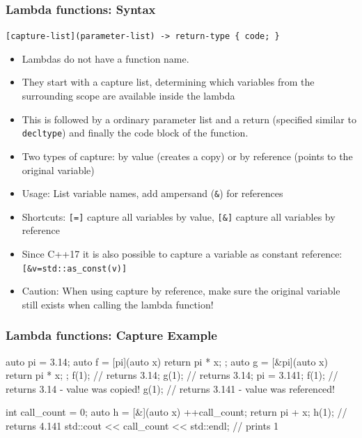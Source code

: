 \documentclass[aspectratio=169,ignorenonframetext,11pt]{beamer}
\def\inline{\lstinline[basicstyle=\small\ttfamily]}
\begin{document}
\begin{frame}[fragile]
  \frametitle{Lambda functions: Syntax}
\inline![capture-list](parameter-list) -> return-type { code; }!
\vspace*{1em}
  \begin{itemize}
  \item Lambdas do not have a function name. 
  \item They start with a capture list, determining which variables from the surrounding scope are available inside the lambda
  \item This is followed by a ordinary parameter list and a return (specified similar to \lstinline!decltype!) and finally the code block of the function.
  \item Two types of capture: by value (creates a copy) or by reference (points to the original variable)
  \item Usage: List variable names, add ampersand (\inline!&!) for references
  \item Shortcuts: \inline![=]! capture all variables by value, \inline![&]! capture all variables by reference
  \item Since C++17 it is also possible to capture a variable as constant reference: \inline![&v=std::as_const(v)]!
  \item \alert{Caution:} When using capture by reference, make sure the original variable still exists when calling the lambda function!
  \end{itemize}
\end{frame}

\begin{frame}[fragile]
\frametitle{Lambda functions: Capture Example}
\begin{cppcode}
auto pi = 3.14;
auto f = [pi](auto x) { return pi * x; };
auto g = [&pi](auto x) { return pi * x; };
f(1); // returns 3.14;
g(1); // returns 3.14;
pi = 3.141;
f(1); // returns 3.14 - value was copied!
g(1); // returns 3.141 - value was referenced!

int call_count = 0;
auto h = [&](auto x) 
{
  ++call_count;
  return pi + x;
}
h(1); // returns 4.141
std::cout << call_count << std::endl; // prints 1
\end{cppcode}

\end{frame}
\end{document}
